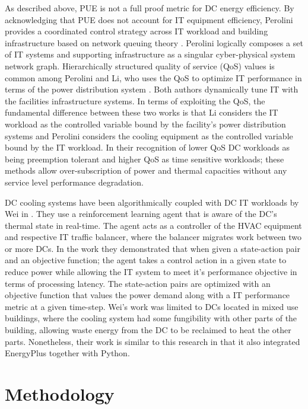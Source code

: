 As described above, PUE is not a full proof metric for DC energy efficiency. By acknowledging that PUE does not account for IT equipment efficiency, Perolini provides a coordinated control strategy across IT workload and building infrastructure based on network queuing theory \citep{parolini12}. Perolini logically composes a set of IT systems and supporting infrastructure as a singular cyber-physical system network graph. Hierarchically structured quality of service (QoS) values is common among Perolini and Li, who uses the QoS to optimize IT performance in terms of the power distribution system \citep{Li18}. Both authors dynamically tune IT with the facilities infrastructure systems. In terms of exploiting the QoS,  the fundamental difference between these two works is that Li considers the IT workload as the controlled variable bound by the facility's power distribution systems and Perolini considers the cooling equipment as the controlled variable bound by the IT workload. In their recognition of lower QoS DC workloads as being preemption tolerant and higher QoS as time sensitive workloads; these methods allow over-subscription of power and thermal capacities without any service level performance degradation. 

DC cooling systems have been algorithmically coupled with DC IT workloads by Wei in \citep{wei17}. They use a reinforcement learning agent that is aware of the DC's thermal state in real-time. The agent acts as a controller of the HVAC equipment and respective IT traffic balancer, where the balancer migrates work between two or more DCs. In the work they demonstrated that when given a state-action pair and an objective function; the agent takes a control action in a given state to reduce power while allowing the IT system to meet it's performance objective in terms of processing latency. The state-action pairs are optimized with an objective function that values the power demand along with a IT performance metric at a given time-step. Wei's work was limited to DCs located in mixed use buildings, where the cooling system had some fungibility with other parts of the building, allowing waste energy from the DC to be reclaimed to heat the other parts. Nonetheless, their work is similar to this research in that it also integrated EnergyPlus together with Python.

\section*{Methodology}


